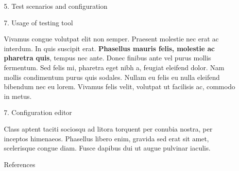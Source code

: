 \documentclass[final]{beamer}
\newlength{\sepwidth}
\newlength{\colwidth}
\newcommand{\separatorcolumn}{\begin{column}{\sepwidth}\end{column}}
\begin{document}
\begin{frame}[t]
\begin{columns}[t]
\begin{column}{\colwidth}
\begin{block}{5. Test scenarios and configuration}
  \end{block}

  \begin{exampleblock}{7. Usage of testing tool}

    Vivamus congue volutpat elit non semper. Praesent molestie nec erat ac
    interdum. In quis suscipit erat. \textbf{Phasellus mauris felis, molestie
    ac pharetra quis}, tempus nec ante. Donec finibus ante vel purus mollis
    fermentum. Sed felis mi, pharetra eget nibh a, feugiat eleifend dolor. Nam
    mollis condimentum purus quis sodales. Nullam eu felis eu nulla eleifend
    bibendum nec eu lorem. Vivamus felis velit, volutpat ut facilisis ac,
    commodo in metus.

  \end{exampleblock}

  \begin{block}{7. Configuration editor}

    Class aptent taciti sociosqu ad litora torquent per conubia nostra, per
    inceptos himenaeos. Phasellus libero enim, gravida sed erat sit amet,
    scelerisque congue diam. Fusce dapibus dui ut augue pulvinar iaculis.

  \end{block}

  \begin{block}{References}

    \nocite{*}
    \footnotesize{}

  \end{block}

\end{column}

\separatorcolumn
\end{columns}
\end{frame}
\end{document}
